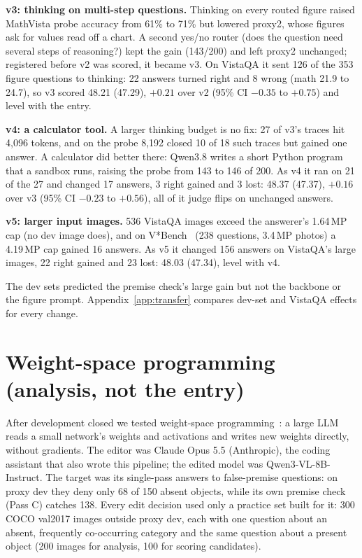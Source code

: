\documentclass{article}
\begin{document}
\textbf{v3: thinking on multi-step questions.} Thinking on every routed figure raised MathVista probe accuracy from 61\% to 71\%
but lowered proxy2, whose figures ask for values read off a chart. A second yes/no router (does the question need several steps
of reasoning?) kept the gain (143/200) and left proxy2 unchanged; registered before v2 was scored, it became v3. On VistaQA it
sent 126 of the 353 figure questions to thinking: 22 answers turned right and 8 wrong (math 21.9 to 24.7), so v3 scored 48.21
(47.29), $+0.21$ over v2 (95\% CI $-0.35$ to $+0.75$) and level with the entry.

\textbf{v4: a calculator tool.} A larger thinking budget is no fix: 27 of v3's traces hit 4,096 tokens, and on the probe 8,192
closed 10 of 18 such traces but gained one answer. A calculator did better there: Qwen3.8 writes a short Python program that a
sandbox runs, raising the probe from 143 to 146 of 200. As v4 it ran on 21 of the 27 and changed 17 answers, 3 right gained and
3 lost: 48.37 (47.37), $+0.16$ over v3 (95\% CI $-0.23$ to $+0.56$), all of it judge flips on unchanged answers.

\textbf{v5: larger input images.} 536 VistaQA images exceed the answerer's 1.64\,MP cap (no dev image does), and on
V*Bench~\cite{vstar} (238 questions, 3.4\,MP photos) a 4.19\,MP cap gained 16 answers. As v5 it changed 156 answers on
VistaQA's large images, 22 right gained and 23 lost: 48.03 (47.34), level with v4.

The dev sets predicted the premise check's large gain but not the backbone or the figure prompt.
Appendix~\ref{app:transfer} compares dev-set and VistaQA effects for every change.

\section{Weight-space programming (analysis, not the entry)}\label{app:wsp}
After development closed we tested weight-space programming~\cite{takehi2026wsp}: a large LLM reads a small network's weights
and activations and writes new weights directly, without gradients. The editor was Claude Opus 5.5 (Anthropic), the coding
assistant that also wrote this pipeline; the edited model was Qwen3-VL-8B-Instruct. The target was its single-pass answers to
false-premise questions: on proxy dev they deny only 68 of 150 absent objects, while its own premise check (Pass C) catches 138.
Every edit decision used only a practice set built for it: 300 COCO val2017 images outside proxy dev, each with one question about
an absent, frequently co-occurring category and the same question about a present object (200 images for analysis, 100 for
scoring candidates).
\end{document}

